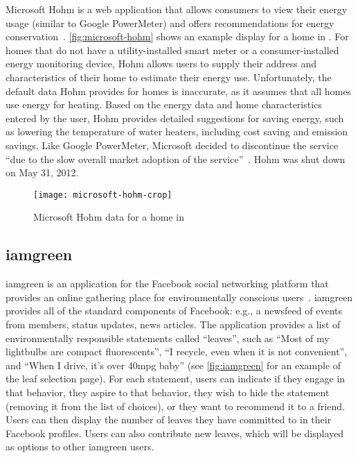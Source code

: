 Microsoft Hohm is a web application that allows consumers to view their energy usage (similar to Google PowerMeter) and offers recommendations for energy conservation~\cite{MS-Hohm-website}. \autoref{fig:microsoft-hohm} shows an example display for a home in \Hawaii. For homes that do not have a utility-installed smart meter or a consumer-installed energy monitoring device, Hohm allows users to supply their address and characteristics of their home to estimate their energy use. Unfortunately, the default data Hohm provides for \Hawaii homes is inaccurate, as it assumes that all homes use energy for heating. Based on the energy data and home characteristics entered by the user, Hohm provides detailed suggestions for saving energy, such as lowering the temperature of water heaters, including cost saving and \COtwo emission savings. Like Google PowerMeter, Microsoft decided to discontinue the service ``due to the slow overall market adoption of the service''~\cite{Hohm-discontinued}. Hohm was shut down on May 31, 2012.

\begin{figure}[htbp]
	\centering
		\texttt{[image: microsoft-hohm-crop]}
		\caption{Microsoft Hohm data for a home in \Hawaii}
		\label{fig:microsoft-hohm}
\end{figure}


\subsection{iamgreen}
\label{sec:iamgreen}

iamgreen is an application for the Facebook social networking platform that provides an online gathering place for environmentally conscious users~\cite{iamgreen-website}. iamgreen provides all of the standard components of Facebook: e.g., a newsfeed of events from members, status updates, news articles. The application provides a list of environmentally responsible statements called ``leaves'', such as ``Most of my lightbulbs are compact fluorescents'', ``I recycle, even when it is not convenient'', and ``When I drive, it's over 40mpg baby'' (see \autoref{fig:iamgreen} for an example of the leaf selection page). For each statement, users can indicate if they engage in that behavior, they aspire to that behavior, they wish to hide the statement (removing it from the list of choices), or they want to recommend it to a friend. Users can then display the number of leaves they have committed to in their Facebook profiles. Users can also contribute new leaves, which will be displayed as options to other iamgreen users.

